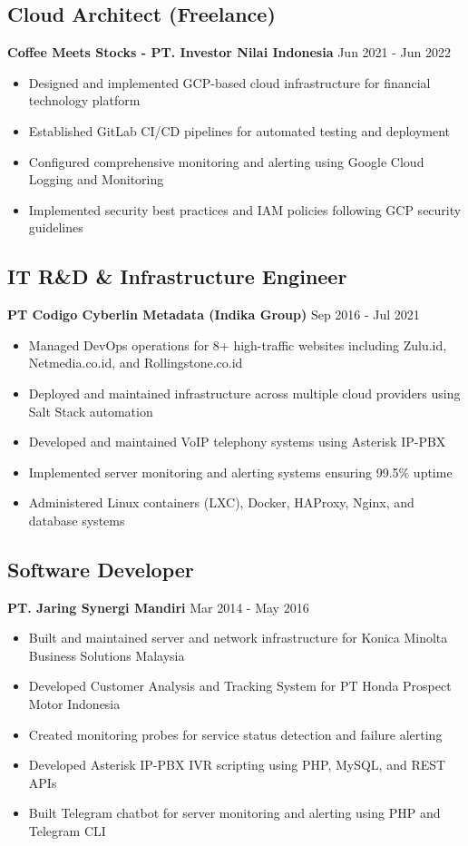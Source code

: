 \documentclass[11pt,a4paper]{article}
\newcommand{\company}[1]{\textbf{\color{primary}#1}}
\newcommand{\daterange}[1]{\color{secondary}#1}  %
\begin{document}
\subsection{Cloud Architect (Freelance)}
\company{Coffee Meets Stocks - PT. Investor Nilai Indonesia} \hfill \daterange{Jun 2021 - Jun 2022}
\begin{itemize}[leftmargin=*, itemsep=2pt]
    \item Designed and implemented GCP-based cloud infrastructure for financial technology platform
    \item Established GitLab CI/CD pipelines for automated testing and deployment
    \item Configured comprehensive monitoring and alerting using Google Cloud Logging and Monitoring
    \item Implemented security best practices and IAM policies following GCP security guidelines
\end{itemize}

\subsection{IT R\&D \& Infrastructure Engineer}
\company{PT Codigo Cyberlin Metadata (Indika Group)} \hfill \daterange{Sep 2016 - Jul 2021}
\begin{itemize}[leftmargin=*, itemsep=2pt]
    \item Managed DevOps operations for 8+ high-traffic websites including Zulu.id, Netmedia.co.id, and Rollingstone.co.id
    \item Deployed and maintained infrastructure across multiple cloud providers using Salt Stack automation
    \item Developed and maintained VoIP telephony systems using Asterisk IP-PBX
    \item Implemented server monitoring and alerting systems ensuring 99.5\% uptime
    \item Administered Linux containers (LXC), Docker, HAProxy, Nginx, and database systems
\end{itemize}

\subsection{Software Developer}
\company{PT. Jaring Synergi Mandiri} \hfill \daterange{Mar 2014 - May 2016}
\begin{itemize}[leftmargin=*, itemsep=2pt]
    \item Built and maintained server and network infrastructure for Konica Minolta Business Solutions Malaysia
    \item Developed Customer Analysis and Tracking System for PT Honda Prospect Motor Indonesia
    \item Created monitoring probes for service status detection and failure alerting
    \item Developed Asterisk IP-PBX IVR scripting using PHP, MySQL, and REST APIs
    \item Built Telegram chatbot for server monitoring and alerting using PHP and Telegram CLI
\end{itemize}
\end{document}
